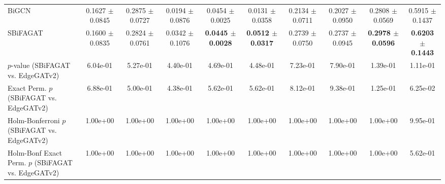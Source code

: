 \begin{table}[t]
{\begin{tabular}{lccccccccc}
BiGCN & 0.1627 $\pm$ 0.0845 & 0.2875 $\pm$ 0.0727 & 0.0194 $\pm$ 0.0876 & 0.0454 $\pm$ 0.0025 & 0.0131 $\pm$ 0.0358 & 0.2134 $\pm$ 0.0711 & 0.2027 $\pm$ 0.0950 & 0.2808 $\pm$ 0.0569 & 0.5915 $\pm$ 0.1437 \\
SBiFAGAT & 0.1600 $\pm$ 0.0835 & 0.2824 $\pm$ 0.0761 & 0.0342 $\pm$ 0.1076 & \textbf{0.0445 $\pm$ 0.0028} & \textbf{0.0512 $\pm$ 0.0317} & 0.2739 $\pm$ 0.0750 & 0.2737 $\pm$ 0.0945 & \textbf{0.2978 $\pm$ 0.0596} & \textbf{0.6203 $\pm$ 0.1443} \\
\midrule
$p$-value (SBiFAGAT vs. EdgeGATv2) & 6.04e-01 & 5.27e-01 & 4.40e-01 & 4.69e-01 & 4.48e-01 & 7.23e-01 & 7.90e-01 & 1.39e-01 & 1.11e-01 \\
Exact Perm. $p$ (SBiFAGAT vs. EdgeGATv2) & 6.88e-01 & 5.00e-01 & 4.38e-01 & 5.62e-01 & 5.62e-01 & 8.12e-01 & 9.38e-01 & 1.25e-01 & 6.25e-02 \\
Holm-Bonferroni $p$ (SBiFAGAT vs. EdgeGATv2) & 1.00e+00 & 1.00e+00 & 1.00e+00 & 1.00e+00 & 1.00e+00 & 1.00e+00 & 1.00e+00 & 1.00e+00 & 9.95e-01 \\
Holm-Bonf Exact Perm. $p$ (SBiFAGAT vs. EdgeGATv2) & 1.00e+00 & 1.00e+00 & 1.00e+00 & 1.00e+00 & 1.00e+00 & 1.00e+00 & 1.00e+00 & 1.00e+00 & 5.62e-01 \\
\bottomrule
\end{tabular}
}
\end{table}
